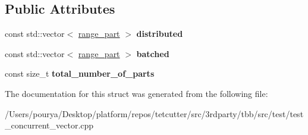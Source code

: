 \subsection*{Public Attributes}
\begin{DoxyCompactItemize}
\item 
\hypertarget{structgrain__map_a0fb73ad2feb34e6c56a5c7da73c268ba}{}const std\+::vector$<$ \hyperlink{structgrain__map_1_1range__part}{range\+\_\+part} $>$ {\bfseries distributed}\label{structgrain__map_a0fb73ad2feb34e6c56a5c7da73c268ba}

\item 
\hypertarget{structgrain__map_aa2df5bccebf551dd6e342e66c0491ab6}{}const std\+::vector$<$ \hyperlink{structgrain__map_1_1range__part}{range\+\_\+part} $>$ {\bfseries batched}\label{structgrain__map_aa2df5bccebf551dd6e342e66c0491ab6}

\item 
\hypertarget{structgrain__map_accb3578d932f8b15b13d057f05249e5e}{}const size\+\_\+t {\bfseries total\+\_\+number\+\_\+of\+\_\+parts}\label{structgrain__map_accb3578d932f8b15b13d057f05249e5e}

\end{DoxyCompactItemize}


The documentation for this struct was generated from the following file\+:\begin{DoxyCompactItemize}
\item 
/\+Users/pourya/\+Desktop/platform/repos/tetcutter/src/3rdparty/tbb/src/test/test\+\_\+concurrent\+\_\+vector.\+cpp\end{DoxyCompactItemize}
